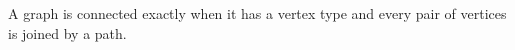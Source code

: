 A graph is connected exactly when it has a vertex type and every pair of vertices is joined by a path.
